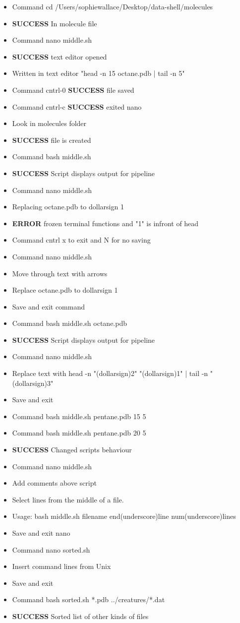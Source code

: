 \documentclass{article}
\begin{document}
\begin{itemize}
\item Command cd /Users/sophiewallace/Desktop/data-shell/molecules
\item \textbf{SUCCESS} In molecule file
\item Command nano middle.sh
\item \textbf{SUCCESS} text editor opened
\item Written in text editor "head -n 15 octane.pdb | tail -n 5"
\item Command cntrl-0 \textbf{SUCCESS} file saved
\item Command cntrl-c \textbf{SUCCESS} exited nano
\item Look in molecules folder 
\item \textbf{SUCCESS} file is created
\item Command bash middle.sh
\item \textbf{SUCCESS} Script displays output for pipeline
\item Command nano middle.sh
\item Replacing octane.pdb to dollarsign 1
\item \textbf{ERROR} frozen terminal functions and "1" is infront of head
\item Command cntrl x to exit and N for no saving
\item Command nano middle.sh
\item Move through text with arrows
\item Replace octane.pdb to dollarsign 1
\item Save and exit command
\item Command bash middle.sh octane.pdb
\item \textbf{SUCCESS} Script displays output for pipeline
\item Command nano middle.sh
\item Replace text with head -n "(dollarsign)2" "(dollarsign)1" | tail -n "(dollarsign)3"
\item Save and exit
\item Command bash middle.sh pentane.pdb 15 5
\item Command bash middle.sh pentane.pdb 20 5
\item \textbf{SUCCESS} Changed scripts behaviour
\item Command nano middle.sh
\item Add comments above script
\item Select lines from the middle of a file.
\item Usage: bash middle.sh filename end(underscore)line num(underscore)lines
\item Save and exit nano
\item Command nano sorted.sh
\item Insert command lines from Unix
\item Save and exit
\item Command bash sorted.sh *.pdb ../creatures/*.dat
\item \textbf{SUCCESS} Sorted list of other kinds of files
\end{itemize}
\end{document}
